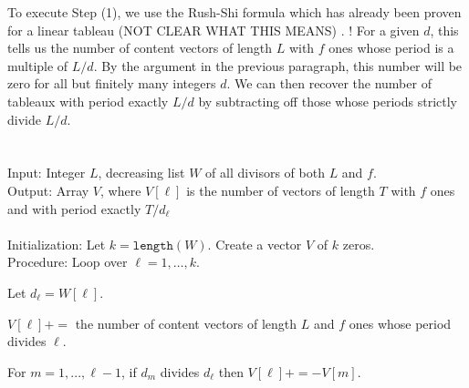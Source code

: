 \documentclass[12pt]{amsart}
\theoremstyle{definition}
\theoremstyle{remark}
\numberwithin{equation}{section}
\begin{document}

To execute Step (1), we use the Rush-Shi formula which has already been proven for a linear tableau (NOT CLEAR WHAT THIS MEANS) \cite[Theorem~1.1(b)]{Reiner.Stanton.White}. ! For a given $d$, this tells us the number of content vectors of length $L$ with $f$ ones whose period is a multiple of $L/d$. By the argument in the previous paragraph, this number will be zero for all but finitely many integers $d$. We can then recover the number of tableaux with period exactly $L/d$ by subtracting off those whose periods strictly divide $L/d$.
\-\ \\ \-\ \\ 
 \\ \noindent
\textsf{Input}: Integer $L$, decreasing list $W$ of all divisors of both $L$ and $f$. \\ \noindent
\textsf{Output}: Array $V$, where $V[\ell]$ is the number of vectors of length $T$ with $f$ ones and with period exactly $T/d_{\ell}$ \\ \-\ \\
\textsf{Initialization}: Let $k = \texttt{length}(W)$. Create a vector $V$ of $k$ zeros. \\ 
\textsf{Procedure}: Loop over $\ell = 1, \ldots, k$.
\begin{arrowlist}
\item Let $d_{\ell} = W[\ell]$.
\item $V[\ell] += $ the number of content vectors of length $L$ and $f$ ones whose period divides $\ell$.
\item For $m = 1,...,\ell-1$, if $d_m$ divides $d_\ell$ then $V[\ell] += - V[m]$.
\end{arrowlist} \-\
\end{document}
